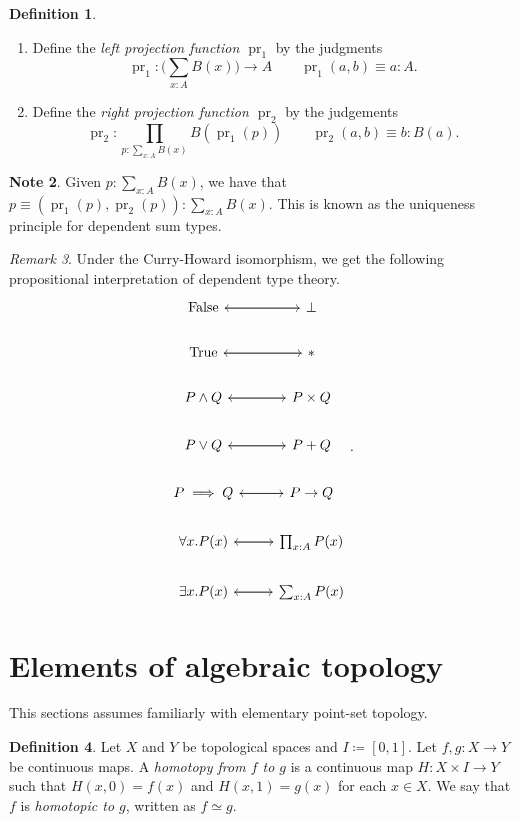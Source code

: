 \documentclass[10pt,letterpaper,cm]{nupset}
\theoremstyle{definition}
\newtheorem{definition}{Definition}[subsection]
\newtheorem{note}[definition]{Note}
\theoremstyle{theorem}
\theoremstyle{remark}
\newtheorem{remark}[definition]{Remark}
\newcommand{\1}{\mathbf{1}}
\newcommand{\0}{\vec 0}
\DeclareMathOperator{\pr}{pr}
\begin{document}
\begin{definition} $ $
\begin{enumerate}
\item Define the \textit{left projection function $\pr_1$} by the judgments $$\pr_1 : \big (\sum_{x:A}B(x) \big) \to A  \quad \quad \pr_1(a,b) \equiv a: A.$$
\item Define the \textit{right projection function $\pr_2$} by the judgements  $$ \pr_2 : \prod_{p: \sum_{x:A}B(x)} B(\pr_1(p)) \quad \quad \pr_2(a,b) \equiv b :B(a). $$
\end{enumerate}
\end{definition}

\begin{note}
Given $p: \sum_{x:A} B(x)$, we have that $p\equiv (\pr_1(p), \pr_2(p)) : \sum_{x:A}B(x)$. This is known as the uniqueness principle for dependent sum types.
\end{note}

\begin{remark}
Under the Curry-Howard isomorphism, we get the following propositional interpretation of dependent type theory.
\[
\begin{tikzcd}
\text{False} \arrow[r] & \bot \arrow[l] \\
\text{True} \arrow[r] & \ast \arrow[l] \\
P \land Q \arrow[r] & P\times Q \arrow[l] \\
P\vee Q \arrow[r] & P + Q \arrow[l] \\
P \implies Q \arrow[r] & P \to Q \arrow[l] \\
\forall x.P(x) \arrow[r] & \prod_{x:A}P(x) \arrow[l] \\
\exists x. P(x) \arrow[r] & \sum_{x:A}P(x) \arrow[l]
\end{tikzcd}
.\]
\end{remark}


\section{Elements of algebraic topology}

This sections assumes familiarly with elementary point-set topology.

\begin{definition}
Let $X$ and $Y$ be topological spaces and $I\coloneqq [0,1]$. Let $f,g: X \to Y$ be continuous maps. A \textit{homotopy from $f$ to $g$} is a continuous map $H: X \times I \to Y$ such that $H(x,0) = f(x)$ and $H(x,1) = g(x)$ for each $x\in X$. We say that $f$ is \textit{homotopic to $g$}, written as $f\simeq g$.
\end{definition}
\end{document}
